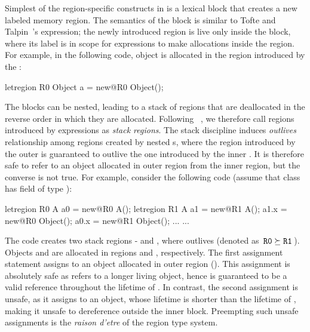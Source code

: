 Simplest of the region-specific constructs in \name is a 
lexical block that creates a new labeled memory region. The semantics
of the  block is similar to Tofte and
Talpin~\cite{ttpopl94}'s  expression; the newly
introduced region is live only inside the block, where its label is in
scope for  expressions to make allocations inside the region.
For example, in the following code, object  is allocated in the
region  introduced by the :
\begin{center}
\begin{codejava}
  letregion R0 {
    Object a = new@R0 Object();
  }
\end{codejava}
\end{center}
The  blocks can be nested, leading to a stack of regions
that are deallocated in the reverse order in which they are allocated.
Following ~\cite{cyclonepldi02}, we therefore call regions introduced
by  expressions as \emph{stack regions}. The stack
discipline induces \emph{outlives} relationship among regions created
by nested s, where the region introduced by the outer
 is guaranteed to outlive the one introduced by the inner
. It is therefore safe to refer to an object allocated in
outer region from the inner region, but the converse is not true. For
example, consider the following code (assume that class  has
field  of type ):
\begin{center}
\begin{codejava}
  letregion R0 {
    A a0 = new@R0 A();
    letregion R1 {
      A a1 = new@R1 A();
      a1.x = new@R0 Object();
      a0.x = new@R1 Object();
      ...
    }
    ...
  }
\end{codejava}
\end{center}
The code creates two stack regions -  and , where 
outlives  (denoted as $\,{\tt R0 \succeq R1}\,$). Objects  and
 are allocated in regions  and , respectively. The
first assignment statement assigns to  an object allocated in
outer region (). This assignment is absolutely safe as 
refers to a longer living object, hence is guaranteed to be a valid
reference throughout the lifetime of . In contrast, the second
assignment is unsafe, as it assigns to  an object, whose
lifetime is shorter than the lifetime of , making it unsafe to
dereference  outside the inner block. 
Preempting such unsafe assignments is the \emph{raison d'etre} of the
region type system.

